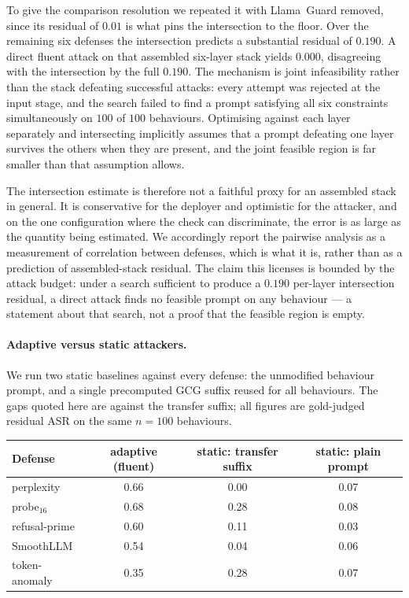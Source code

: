 To give the comparison resolution we repeated it with Llama~Guard removed, since its residual
of $0.01$ is what pins the intersection to the floor. Over the remaining six defenses the
intersection predicts a substantial residual of $0.190$. A direct fluent attack on that
assembled six-layer stack yields $0.000$, disagreeing with the intersection by the full
$0.190$. The mechanism is joint infeasibility rather than the stack defeating successful
attacks: every attempt was rejected at the input stage, and the search failed to find a prompt
satisfying all six constraints simultaneously on $100$ of $100$ behaviours. Optimising against
each layer separately and intersecting implicitly assumes that a prompt defeating one layer
survives the others when they are present, and the joint feasible region is far smaller than
that assumption allows.

The intersection estimate is therefore not a faithful proxy for an assembled stack in general.
It is conservative for the deployer and optimistic for the attacker, and on the one
configuration where the check can discriminate, the error is as large as the quantity being
estimated. We accordingly report the pairwise analysis as a measurement of correlation between
defenses, which is what it is, rather than as a prediction of assembled-stack residual. The
claim this licenses is bounded by the attack budget: under a search sufficient to produce a
$0.190$ per-layer intersection residual, a direct attack finds no feasible prompt on any
behaviour --- a statement about that search, not a proof that the feasible region is empty.

\paragraph{Adaptive versus static attackers.}
We run two static baselines against every defense: the unmodified behaviour prompt, and a
single precomputed GCG suffix reused for all behaviours. The gaps quoted here are against the
transfer suffix; all figures are gold-judged residual ASR on the same $n=100$ behaviours.

\begin{center}
\begin{tabular}{lccc}
\toprule
Defense & adaptive (fluent) & static: transfer suffix & static: plain prompt \\
\midrule
perplexity          & 0.66 & 0.00 & 0.07 \\
probe$_{16}$        & 0.68 & 0.28 & 0.08 \\
refusal-prime       & 0.60 & 0.11 & 0.03 \\
SmoothLLM           & 0.54 & 0.04 & 0.06 \\
token-anomaly       & 0.35 & 0.28 & 0.07 \\
\bottomrule
\end{tabular}
\end{center}

